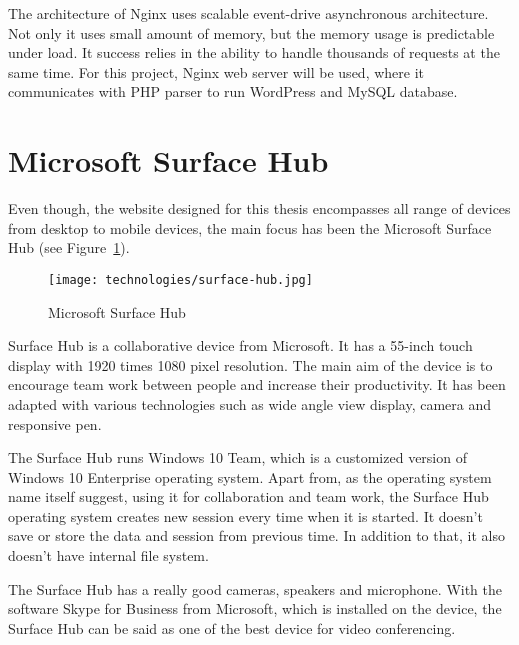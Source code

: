 The architecture of Nginx uses scalable event-drive asynchronous architecture. Not only it uses small amount of memory, but the memory usage is predictable under load. It success relies in the ability to handle thousands of requests at the same time. For this project, Nginx web server will be used, where it communicates with PHP parser to run WordPress and MySQL database.

\section{Microsoft Surface Hub}
Even though, the website designed for this thesis encompasses all range of devices from desktop to mobile devices, the main focus has been the Microsoft Surface Hub (see Figure~\ref{fig:surface-hub}).

\begin{figure}[ht]
\caption{Microsoft Surface Hub}
\label{fig:surface-hub}
\centering
\texttt{[image: technologies/surface-hub.jpg]}
\end{figure}

Surface Hub is a collaborative device from Microsoft. It has a 55-inch touch display with 1920 times 1080 pixel resolution. The main aim of the device is to encourage team work between people and increase their productivity. It has been adapted with various technologies such as wide angle view display, camera and responsive pen. 

The Surface Hub runs Windows 10 Team, which is a customized version of Windows 10 Enterprise operating system. Apart from, as the operating system name itself suggest, using it for collaboration and team work, the Surface Hub operating system creates new session every time when it is started. It doesn't save or store the data and session from previous time. In addition to that, it also doesn't have internal file system.

The Surface Hub has a really good cameras, speakers and microphone. With the software Skype for Business from Microsoft,  which is installed on the device, the Surface Hub can be said as one of the best device for video conferencing. 

